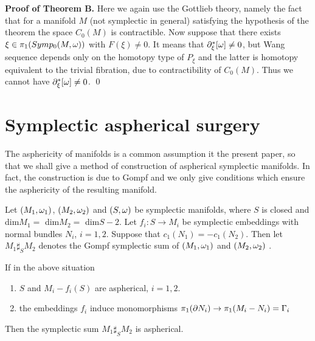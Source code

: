 \bigskip

 {\bf Proof of Theorem B.} Here we again use the Gottlieb theory,
namely the fact that for a manifold $M$ (not symplectic in general)
 satisfying the hypothesis
of the theorem the space $C_0(M)$ is contractible.
Now suppose that there exists $\xi \in \pi _1(Symp_0(M,\omega)) $ with $F(\xi )\neq 0$.
It means that $\partial _\xi^*[\omega ]\neq 0$, but Wang sequence
depends only on the homotopy type of $P_{\xi }$ and the
latter is homotopy equivalent to the trivial fibration,
due to contractibility of $C_0(M)$. Thus we cannot have
$\partial _\xi ^*[\omega ]\neq 0$. 
\qed

 
\bigskip


\bigskip




































\section{Symplectic aspherical surgery}


\bigskip

The asphericity of manifolds is a common assumption it the present
paper, so that we shall give a method of construction
of aspherical symplectic manifolds. In fact, the construction
is due to Gompf \cite{gom,mw} and we only give conditions which
ensure the asphericity of the resulting manifold.
 
Let $(M_1,\omega _1) $, $(M_2,\omega _2) $ and $(S,\omega )$ 
be symplectic manifolds,
where $S$ is closed and dim$M_1=$ dim$M_2=$ dim$S-2$.
Let $f_i:S\to M_i$ be symplectic embeddings with normal bundles 
$N_i$, $i=1,2$. Suppose that $c_1(N_1)=-c_1(N_2)$. Then let
$M_1\sharp _SM_2$ denotes the Gompf symplectic sum
of $(M_1,\omega _1)$ and $(M_2,\omega _2)$ \cite{gom}.

\bigskip

\begin{Prop} 
If in the
above situation
    \begin{enumerate}
          \item $S$ and $M_i-f_i(S)$ are aspherical, $i=1,2.$

          \item the embeddings $f_i$ induce monomorphisms
                $\pi _1(\partial N_i)\to \pi _1(M_i- N_i)=\Gamma _i$

\end{enumerate}
Then the symplectic sum $M_1\sharp _SM_2$ is aspherical.
\end{Prop}

